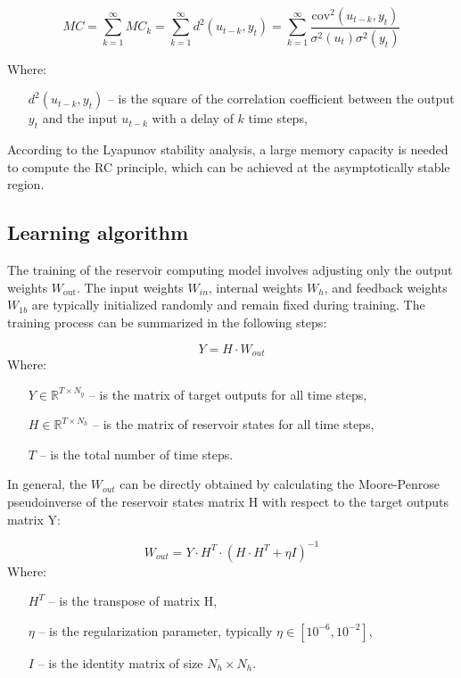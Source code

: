 \documentclass[11pt, oneside]{article}
\begin{document}
\begin{equation}
    MC = \sum_{k=1}^{\infty} MC_k =
    \sum_{k=1}^{\infty} d^2(u_{t-k}, y_t) =  \sum_{k=1}^{\infty} \frac{\mathrm{cov}^2(u_{t-k}, y_t)}{\sigma^2(u_t) \sigma^2(y_t)}
\end{equation}

Where:
\begin{itemize}[noitemsep, leftmargin=4cm, label={}]
    \item [\(d^2(u_{t-k}, y_t)\)] -- is the square of the correlation coefficient between the output \(y_t\) and the input \(u_{t-k }\) with a delay of \(k\) time steps,
\end{itemize}

According to the Lyapunov stability analysis, a large memory capacity is needed to compute the RC principle, which can be achieved at the asymptotically stable region.


\subsection{Learning algorithm}
The training of the reservoir computing model involves adjusting only the output weights \(W_{\mathrm{out}}\). The input weights \(W_{in}\), internal weights \(W_h\), and feedback weights \(W_{1b}\) are typically initialized randomly and remain fixed during training. The training process can be summarized in the following steps:

\begin{equation}
    Y = H \cdot W_{out}
\end{equation}
Where:
\begin{itemize}[noitemsep, leftmargin=4cm, label={}]
    \item [\(Y \in \mathbb{R}^{T \times N_y}\)] -- is the matrix of target outputs for all time steps,
    \item [\(H \in \mathbb{R}^{T \times N_h}\)] -- is the matrix of reservoir states for all time steps,
    \item [\(T\)] -- is the total number of time steps.
\end{itemize}

In general, the \(W_{out}\) can be directly obtained by calculating the Moore-Penrose pseudoinverse of the reservoir states matrix H with respect to the target outputs matrix Y:

\begin{equation}
    W_{out} = Y \cdot H^{T} \cdot (H \cdot H^{T} + \eta I)^{-1}
\end{equation}
Where:
\begin{itemize}[noitemsep, leftmargin=2cm, label={}]
    \item [\(H^{T}\)] -- is the transpose of matrix H,
    \item [\(\eta\)] -- is the regularization parameter, typically \(\eta \in [10^{-6}, 10^{-2}]\),
    \item [\(I\)] -- is the identity matrix of size \(N_h \times N_h\).
\end{itemize}
\end{document}
